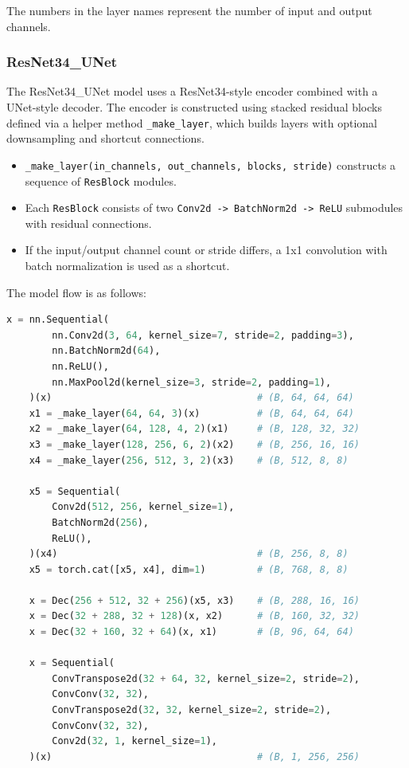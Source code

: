 \documentclass{homework}
\begin{document}
The numbers in the layer names represent the number of input and output channels.

\subsubsection{ResNet34\_UNet}

The ResNet34\_UNet model uses a ResNet34-style encoder combined with a UNet-style decoder. The encoder is constructed using stacked residual blocks defined via a helper method \lstinline{_make_layer}, which builds layers with optional downsampling and shortcut connections.

\begin{itemize}
    \item \lstinline{_make_layer(in_channels, out_channels, blocks, stride)} constructs a sequence of \lstinline{ResBlock} modules.
    \item Each \lstinline{ResBlock} consists of two \lstinline{Conv2d -> BatchNorm2d -> ReLU} submodules with residual connections.
    \item If the input/output channel count or stride differs, a 1x1 convolution with batch normalization is used as a shortcut.
\end{itemize}

The model flow is as follows:

\begin{lstlisting}[language=Python]
    x = nn.Sequential(
        nn.Conv2d(3, 64, kernel_size=7, stride=2, padding=3),
        nn.BatchNorm2d(64),
        nn.ReLU(),
        nn.MaxPool2d(kernel_size=3, stride=2, padding=1),
    )(x)                                    # (B, 64, 64, 64)
    x1 = _make_layer(64, 64, 3)(x)          # (B, 64, 64, 64)
    x2 = _make_layer(64, 128, 4, 2)(x1)     # (B, 128, 32, 32)
    x3 = _make_layer(128, 256, 6, 2)(x2)    # (B, 256, 16, 16)
    x4 = _make_layer(256, 512, 3, 2)(x3)    # (B, 512, 8, 8)

    x5 = Sequential(
        Conv2d(512, 256, kernel_size=1),
        BatchNorm2d(256),
        ReLU(),
    )(x4)                                   # (B, 256, 8, 8)
    x5 = torch.cat([x5, x4], dim=1)         # (B, 768, 8, 8)

    x = Dec(256 + 512, 32 + 256)(x5, x3)    # (B, 288, 16, 16)
    x = Dec(32 + 288, 32 + 128)(x, x2)      # (B, 160, 32, 32)
    x = Dec(32 + 160, 32 + 64)(x, x1)       # (B, 96, 64, 64)

    x = Sequential(
        ConvTranspose2d(32 + 64, 32, kernel_size=2, stride=2),
        ConvConv(32, 32),
        ConvTranspose2d(32, 32, kernel_size=2, stride=2),
        ConvConv(32, 32),
        Conv2d(32, 1, kernel_size=1),
    )(x)                                    # (B, 1, 256, 256)
\end{lstlisting}
\end{document}
